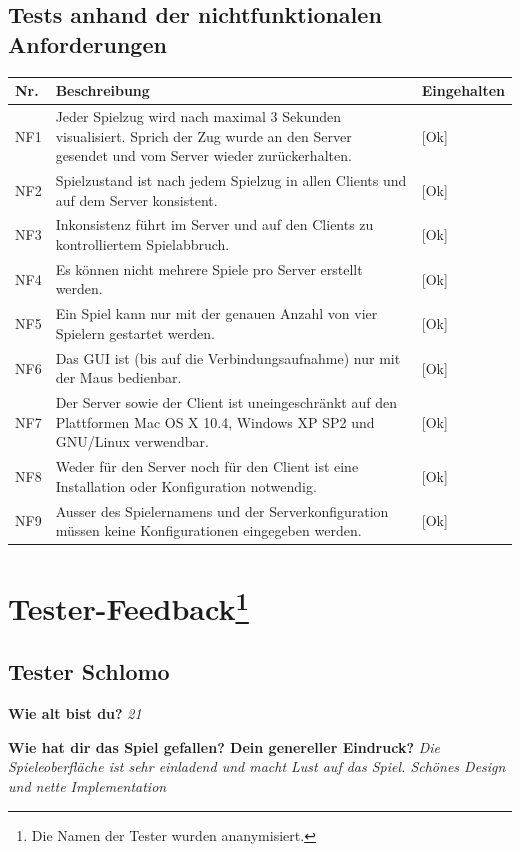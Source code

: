 \documentclass[12pt,halfparskip]{scrartcl}
\begin{document}
\subsection{Tests anhand der nichtfunktionalen Anforderungen}
	\begin {tabular}{l p{11cm} l}
		\toprule
		\textbf{Nr.} & \textbf{Beschreibung} & \textbf{Eingehalten} \\
		\midrule
		NF1 & Jeder Spielzug wird nach maximal 3 Sekunden visualisiert. Sprich der Zug wurde an den Server gesendet und vom Server wieder zurückerhalten. & [Ok] \\
		NF2 & Spielzustand ist nach jedem Spielzug in allen Clients und auf dem Server konsistent. & [Ok] \\
		NF3 & Inkonsistenz führt im Server und auf den Clients zu kontrolliertem Spielabbruch. & [Ok] \\
		NF4 & Es können nicht mehrere Spiele pro Server erstellt werden. & [Ok] \\
		NF5 & Ein Spiel kann nur mit der genauen Anzahl von vier Spielern gestartet werden. & [Ok] \\
		NF6 & Das GUI ist (bis auf die Verbindungsaufnahme) nur mit der Maus bedienbar. & [Ok] \\
		NF7 & Der Server sowie der Client ist uneingeschränkt auf den Plattformen Mac OS X 10.4, Windows XP SP2 und GNU/Linux verwendbar. & [Ok] \\
		NF8 & Weder für den Server noch für den Client ist eine Installation oder Konfiguration notwendig. & [Ok] \\
		NF9 & Ausser des Spielernamens und der Serverkonfiguration müssen keine Konfigurationen eingegeben werden. & [Ok] \\
		\bottomrule
	\end{tabular}

\section[Tester-Feedback]{Tester-Feedback\footnote{Die Namen der Tester wurden ananymisiert.}}

\subsection{Tester Schlomo}
\textbf{Wie alt bist du?}
\emph{21}

\textbf{Wie hat dir das Spiel gefallen? Dein genereller Eindruck?}
\emph{Die Spieleoberfläche ist sehr einladend und macht Lust auf das Spiel. Schönes Design und nette Implementation}
\end{document}

